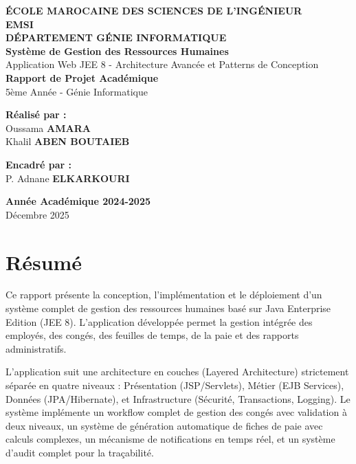 \documentclass[12pt,a4paper,twoside]{report}
\begin{document}
\begin{titlepage}
\centering
{\Huge \textbf{ÉCOLE MAROCAINE DES SCIENCES DE L'INGÉNIEUR}}\\[0.5cm]
{\Large \textbf{EMSI}}\\[2cm]
{\Large \textbf{DÉPARTEMENT GÉNIE INFORMATIQUE}}\\[1cm]
\vspace{1.5cm}
{\huge \textbf{Système de Gestion des Ressources Humaines}}\\[0.5cm]
{\Large Application Web JEE 8 - Architecture Avancée et Patterns de Conception}\\[1cm]
{\large \textbf{Rapport de Projet Académique}}\\[0.5cm]
{\large 5ème Année - Génie Informatique}\\[2cm]
\vspace{1cm}
\begin{minipage}{0.4\textwidth}
\begin{flushleft}
\large \textbf{Réalisé par :}\\[0.5cm]
Oussama \textbf{AMARA}\\[0.3cm]
Khalil \textbf{ABEN BOUTAIEB}
\end{flushleft}
\end{minipage}
\begin{minipage}{0.4\textwidth}
\begin{flushright}
\large \textbf{Encadré par :}\\[0.5cm]
P. Adnane \textbf{ELKARKOURI}
\end{flushright}
\end{minipage}
\vfill
{\large \textbf{Année Académique 2024-2025}}\\[0.3cm]
{\large Décembre 2025}
\end{titlepage}

\tableofcontents
\listoffigures
\listoftables

\chapter*{Résumé}

Ce rapport présente la conception, l'implémentation et le déploiement d'un système complet de gestion des ressources humaines basé sur Java Enterprise Edition (JEE 8). L'application développée permet la gestion intégrée des employés, des congés, des feuilles de temps, de la paie et des rapports administratifs.

L'application suit une architecture en couches (Layered Architecture) strictement séparée en quatre niveaux : Présentation (JSP/Servlets), Métier (EJB Services), Données (JPA/Hibernate), et Infrastructure (Sécurité, Transactions, Logging). Le système implémente un workflow complet de gestion des congés avec validation à deux niveaux, un système de génération automatique de fiches de paie avec calculs complexes, un mécanisme de notifications en temps réel, et un système d'audit complet pour la traçabilité.
\end{document}
